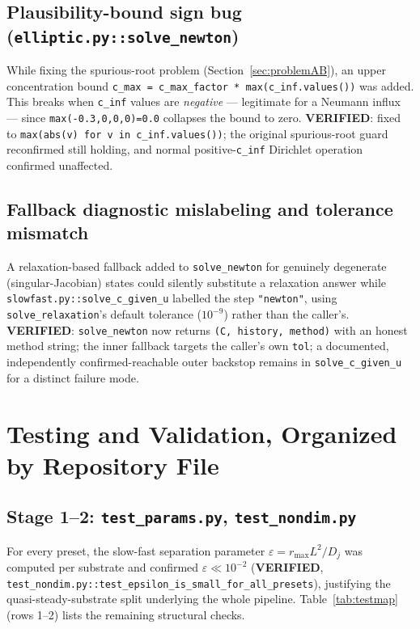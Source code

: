 \documentclass[11pt]{article}
\newcommand{\verified}{\textcolor{green!45!black}{\textbf{VERIFIED}}}
\newcommand{\code}[1]{\texttt{#1}}
\newcommand{\test}[1]{\texttt{\small #1}}
\begin{document}
\subsection{Plausibility-bound sign bug (\code{elliptic.py::solve\_newton})}
While fixing the spurious-root problem (Section~\ref{sec:problemAB}), an
upper concentration bound \code{c\_max = c\_max\_factor * max(c\_inf.values())}
was added. This breaks when \code{c\_inf} values are \emph{negative} ---
legitimate for a Neumann influx --- since \code{max(-0.3,0,0,0)=0.0} collapses
the bound to zero. \verified{}: fixed to \code{max(abs(v) for v in
c\_inf.values())}; the original spurious-root guard reconfirmed still holding,
and normal positive-\code{c\_inf} Dirichlet operation confirmed unaffected.

\subsection{Fallback diagnostic mislabeling and tolerance mismatch}
A relaxation-based fallback added to \code{solve\_newton} for genuinely
degenerate (singular-Jacobian) states could silently substitute a relaxation
answer while \code{slowfast.py::solve\_c\_given\_u} labelled the step
\code{"newton"}, using \code{solve\_relaxation}'s default tolerance
($10^{-9}$) rather than the caller's. \verified{}: \code{solve\_newton} now
returns \code{(C, history, method)} with an honest method string; the inner
fallback targets the caller's own \code{tol}; a documented, independently
confirmed-reachable outer backstop remains in \code{solve\_c\_given\_u} for a
distinct failure mode.

\section{Testing and Validation, Organized by Repository File}

\subsection{Stage 1--2: \code{test\_params.py}, \code{test\_nondim.py}}
For every preset, the slow-fast separation parameter $\varepsilon = r_{\max}
L^2/D_j$ was computed per substrate and confirmed $\varepsilon \ll 10^{-2}$
(\verified{}, \test{test\_nondim.py::test\_epsilon\_is\_small\_for\_all\_presets}),
justifying the quasi-steady-substrate split underlying the whole pipeline.
Table~\ref{tab:testmap} (rows 1--2) lists the remaining structural checks.
\end{document}
